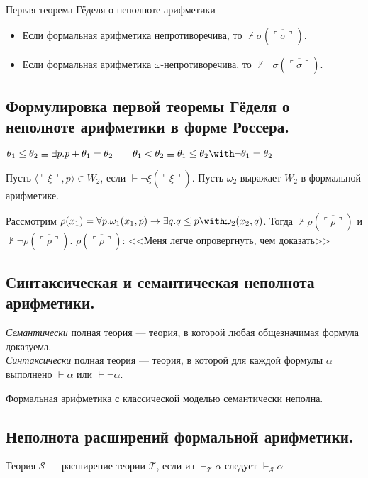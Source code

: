 \documentclass[10pt,a4paper,oneside]{article}
\begin{document}
 {Первая теорема Гёделя о неполноте арифметики}
\begin{itemize}
\item Если формальная арифметика непротиворечива, то $\not\vdash\sigma(\overline{\ulcorner\sigma\urcorner})$.
\item Если формальная арифметика $\omega$-непротиворечива, то $\not\vdash\neg\sigma(\overline{\ulcorner\sigma\urcorner})$.
\end{itemize}

\subsection{Формулировка первой теоремы Гёделя о неполноте арифметики в форме Россера.}
 $\theta_1\le\theta_2 \equiv \exists p.p+\theta_1=\theta_2\quad\quad\theta_1<\theta_2\equiv\theta_1\le\theta_2\with\neg\theta_1=\theta_2$

 Пусть $\langle \ulcorner\xi\urcorner,p\rangle \in W_2$, если $\vdash\neg\xi(\overline{\ulcorner\xi\urcorner})$.
Пусть $\omega_2$ выражает $W_2$ в формальной арифметике.

 Рассмотрим $\rho(x_1) = \forall p.\omega_1(x_1,p)\rightarrow\exists q.q \le p \with \omega_2(x_2,q)$.
Тогда $\not\vdash\rho(\overline{\ulcorner\rho\urcorner})$ и $\not\vdash\neg\rho(\overline{\ulcorner\rho\urcorner})$.
$\rho(\overline{\ulcorner\rho\urcorner})$: <<Меня легче опровергнуть, чем доказать>>


\subsection{Синтаксическая и семантическая неполнота арифметики.}

 \emph{Семантически} полная теория --- теория, в которой любая общезначимая формула доказуема.\\
\emph{Синтаксически} полная теория --- теория, в которой для каждой формулы $\alpha$ выполнено $\vdash\alpha$ или $\vdash\neg\alpha$.

 Формальная арифметика с классической моделью семантически неполна.

\subsection{Неполнота расширений формальной арифметики.}

 Теория $\mathcal{S}$ --- расширение теории $\mathcal{T}$, если
из $\vdash_\mathcal{T} \alpha$ следует $\vdash_\mathcal{S} \alpha$
\end{document}
